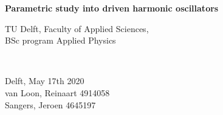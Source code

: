 \begin{titlepage}

\newcommand{\HRule}{\rule{\linewidth}{0.5mm}} %

\center


{ \huge \bfseries Parametric study into driven harmonic oscillators }\\[1cm] %






\vfill
\begin{minipage}{0.4\textwidth}
    \begin{flushleft}
        TU Delft, Faculty of Applied Sciences,\\
        BSc program Applied Physics
    \end{flushleft}
\end{minipage}
~
\begin{minipage}{0.4\textwidth}
    \begin{flushright}
        Delft, May 17th 2020\\
         \hspace{1cm} van Loon, Reinaart 4914058\\
         \hspace{1cm} Sangers, Jeroen 4645197
    \end{flushright}
\end{minipage}\\[1.5cm]


\end{titlepage}
